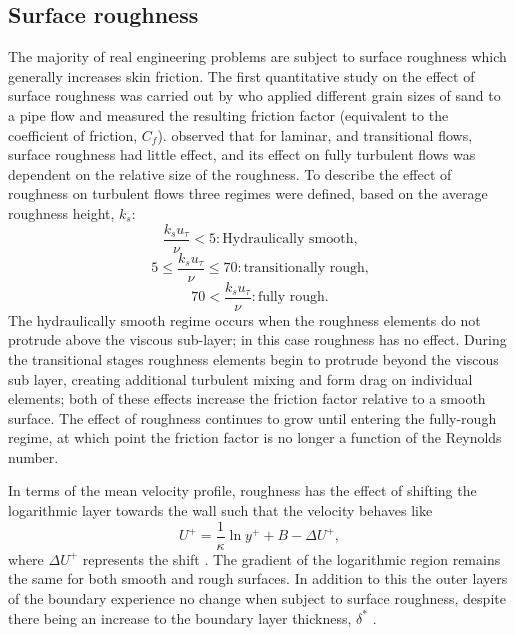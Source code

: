 \documentclass[12pt,oneside,a4paper]{article}
\begin{document}
\subsection{Surface roughness}
\label{section:literatureReview:roughness}
The majority of real engineering problems are subject to surface roughness which generally increases skin friction. The first quantitative study on the effect of surface roughness was carried out by \cite{nikuradse1933} who applied different grain sizes of sand to a pipe flow and measured the resulting friction factor (equivalent to the coefficient of friction, $C_f$). \cite{nikuradse1933} observed that for laminar, and transitional flows, surface roughness had little effect, and its effect on fully turbulent flows was dependent on the relative size of the roughness. To describe the effect of roughness on turbulent flows three regimes were defined, based on the average roughness height, $k_s$:
%
$$\frac{k_s u_\tau}{\nu} < 5: \text{Hydraulically smooth,} $$
$$5 \leq \frac{k_s u_\tau}{\nu} \leq 70:	\text{transitionally rough,} $$
$$70 < \frac{k_s u_\tau}{\nu}:	\text{fully rough.}		$$
%
The hydraulically smooth regime occurs when the roughness elements do not protrude above the viscous sub-layer; in this case roughness has no effect. During the transitional stages roughness elements begin to protrude beyond the viscous sub layer, creating additional turbulent mixing and form drag on individual elements; both of these effects increase the friction factor relative to a smooth surface. The effect of roughness continues to grow until entering the fully-rough regime, at which point the friction factor is no longer a function of the Reynolds number.

In terms of the mean velocity profile, roughness has the effect of shifting the logarithmic layer towards the wall such that the velocity behaves like
\begin{equation}
\label{equation:litReview:roughLawOfWall}
U^+ = \frac{1}{\kappa} \ln{y^+} + B - \Delta U^+,
\end{equation}
where $\Delta U^+$ represents the shift \citep{newhall2006}. The gradient of the logarithmic region remains the same for both smooth and rough surfaces. In addition to this the outer layers of the boundary experience no change when subject to surface roughness, despite there being an increase to the boundary layer thickness, $\delta^*$ \citep{perlin2016}.
\end{document}
